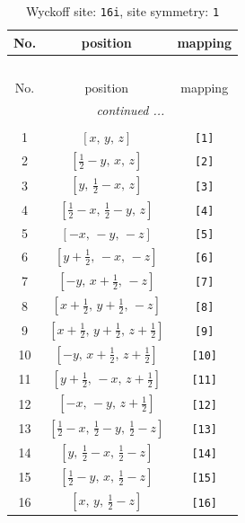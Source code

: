\documentclass[fleqn,8pt]{jsarticle}
\begin{document}
\begin{longtable}{ccc}
\caption{Wyckoff site: {\tt 16i}, site symmetry: {\tt 1}}
 \\
 \hline \hline
No. & position & mapping \\ \hline \endfirsthead

\multicolumn{2}{l}{\tablename\ \thetable{}} \\
 \hline \hline
No. & position & mapping \\ \hline \endhead

 \hline \hline
\multicolumn{2}{r}{\footnotesize\it continued ...} \\ \endfoot

 \hline \hline
\multicolumn{2}{r}{} \\ \endlastfoot

1 & $\left[ x,\, y,\, z \right]$ & {\tt [1]} \\ \hline
2 & $\left[ \frac{1}{2} - y,\, x,\, z \right]$ & {\tt [2]} \\ \hline
3 & $\left[ y,\, \frac{1}{2} - x,\, z \right]$ & {\tt [3]} \\ \hline
4 & $\left[ \frac{1}{2} - x,\, \frac{1}{2} - y,\, z \right]$ & {\tt [4]} \\ \hline
5 & $\left[ - x,\, - y,\, - z \right]$ & {\tt [5]} \\ \hline
6 & $\left[ y + \frac{1}{2},\, - x,\, - z \right]$ & {\tt [6]} \\ \hline
7 & $\left[ - y,\, x + \frac{1}{2},\, - z \right]$ & {\tt [7]} \\ \hline
8 & $\left[ x + \frac{1}{2},\, y + \frac{1}{2},\, - z \right]$ & {\tt [8]} \\ \hline
9 & $\left[ x + \frac{1}{2},\, y + \frac{1}{2},\, z + \frac{1}{2} \right]$ & {\tt [9]} \\ \hline
10 & $\left[ - y,\, x + \frac{1}{2},\, z + \frac{1}{2} \right]$ & {\tt [10]} \\ \hline
11 & $\left[ y + \frac{1}{2},\, - x,\, z + \frac{1}{2} \right]$ & {\tt [11]} \\ \hline
12 & $\left[ - x,\, - y,\, z + \frac{1}{2} \right]$ & {\tt [12]} \\ \hline
13 & $\left[ \frac{1}{2} - x,\, \frac{1}{2} - y,\, \frac{1}{2} - z \right]$ & {\tt [13]} \\ \hline
14 & $\left[ y,\, \frac{1}{2} - x,\, \frac{1}{2} - z \right]$ & {\tt [14]} \\ \hline
15 & $\left[ \frac{1}{2} - y,\, x,\, \frac{1}{2} - z \right]$ & {\tt [15]} \\ \hline
16 & $\left[ x,\, y,\, \frac{1}{2} - z \right]$ & {\tt [16]} \\
\end{longtable}
\end{document}
